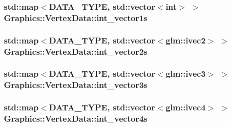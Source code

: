 \subsubsection[{int\+\_\+vector1s}]{\setlength{\rightskip}{0pt plus 5cm}std\+::map$<${\bf D\+A\+T\+A\+\_\+\+T\+Y\+P\+E}, std\+::vector$<$int$>$ $>$ Graphics\+::\+Vertex\+Data\+::int\+\_\+vector1s\hspace{0.3cm}{\ttfamily [private]}}\label{class_graphics_1_1_vertex_data_a9d162343dbfbfec79b69e2f0b5658b23}
\hypertarget{class_graphics_1_1_vertex_data_a2cefac20aaef5f2d926db3cf493ca607}{}
\subsubsection[{int\+\_\+vector2s}]{\setlength{\rightskip}{0pt plus 5cm}std\+::map$<${\bf D\+A\+T\+A\+\_\+\+T\+Y\+P\+E}, std\+::vector$<$glm\+::ivec2$>$ $>$ Graphics\+::\+Vertex\+Data\+::int\+\_\+vector2s\hspace{0.3cm}{\ttfamily [private]}}\label{class_graphics_1_1_vertex_data_a2cefac20aaef5f2d926db3cf493ca607}
\hypertarget{class_graphics_1_1_vertex_data_a7bac97fce5e77e7850a5b4562a08ec0f}{}
\subsubsection[{int\+\_\+vector3s}]{\setlength{\rightskip}{0pt plus 5cm}std\+::map$<${\bf D\+A\+T\+A\+\_\+\+T\+Y\+P\+E}, std\+::vector$<$glm\+::ivec3$>$ $>$ Graphics\+::\+Vertex\+Data\+::int\+\_\+vector3s\hspace{0.3cm}{\ttfamily [private]}}\label{class_graphics_1_1_vertex_data_a7bac97fce5e77e7850a5b4562a08ec0f}
\hypertarget{class_graphics_1_1_vertex_data_a40c1de9342a843c0e7a3d885d55f10f4}{}
\subsubsection[{int\+\_\+vector4s}]{\setlength{\rightskip}{0pt plus 5cm}std\+::map$<${\bf D\+A\+T\+A\+\_\+\+T\+Y\+P\+E}, std\+::vector$<$glm\+::ivec4$>$ $>$ Graphics\+::\+Vertex\+Data\+::int\+\_\+vector4s\hspace{0.3cm}{\ttfamily [private]}}\label{class_graphics_1_1_vertex_data_a40c1de9342a843c0e7a3d885d55f10f4}
\hypertarget{class_graphics_1_1_vertex_data_a65a814100217b32cc5a1f7a9bbd7f13c}{}
